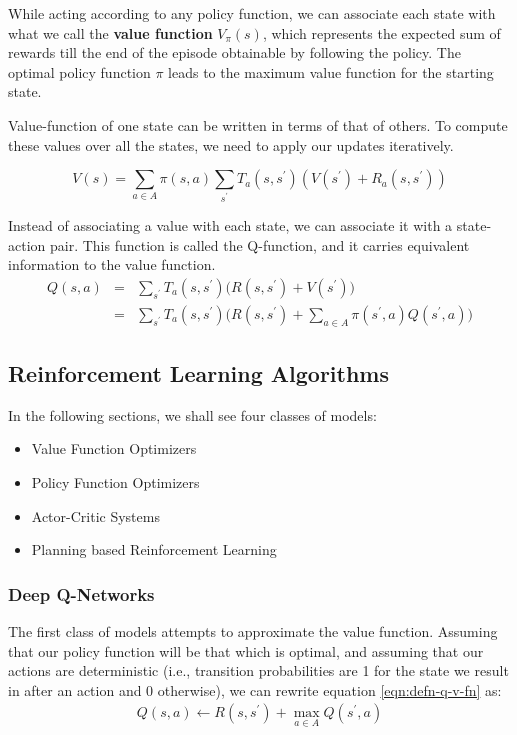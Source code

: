 While acting according to any policy function, we can associate each state with what we call the \textbf{value function} $V_{\pi}(s)$, which represents the expected sum of rewards till the end of the episode obtainable by following the policy. The optimal policy function $\pi$ leads to the maximum value function for the starting state.

Value-function of one state can be written in terms of that of others. To compute these values over all the states, we need to apply our updates iteratively.

\begin{equation}
    V(s) = \sum_{a \in A} \pi(s, a) \sum_{s^\prime} T_a(s, s^\prime) (V(s^\prime) + R_a(s, s^\prime))
\end{equation}

Instead of associating a value with each state, we can associate it with a state-action pair. This function is called the Q-function, and it carries equivalent information to the value function.
\begin{eqnarray}
    Q(s, a) &=& \sum_{s^\prime} T_a(s, s^\prime) \bigg(R(s, s^\prime) + V(s^\prime) \bigg)\\
            &=& \sum_{s^\prime} T_a(s, s^\prime) \bigg(R(s, s^\prime) + \sum_{a \in A} \pi(s^\prime, a) Q(s^\prime, a)\bigg)
            \label{eqn:defn-q-v-fn}
\end{eqnarray}

\subsection{Reinforcement Learning Algorithms}

In the following sections, we shall see four classes of models:
\begin{itemize}
    \item Value Function Optimizers
    \item Policy Function Optimizers
    \item Actor-Critic Systems
    \item Planning based Reinforcement Learning
\end{itemize}


\subsubsection{Deep Q-Networks}

The first class of models attempts to approximate the value function. Assuming that our policy function will be that which is optimal, and assuming that our actions are deterministic (i.e., transition probabilities are 1 for the state we result in after an action and 0 otherwise), we can rewrite equation \ref{eqn:defn-q-v-fn} as:
\begin{eqnarray}\label{eqn:defn-q-fn}
    Q(s, a) \leftarrow R(s, s^\prime) + \max_{a \in A} Q(s^\prime, a)
\end{eqnarray}

